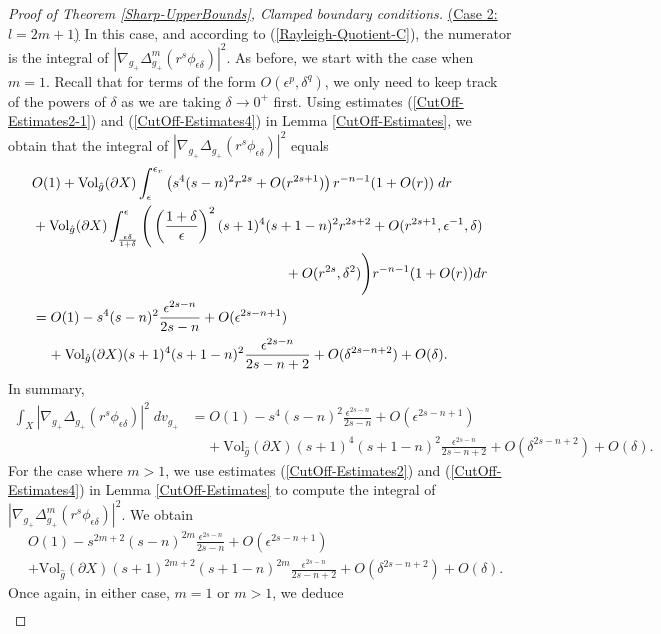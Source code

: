 \documentclass{amsart}
\newcommand{\Vol}{\text{Vol}}
\newcommand{\D}{\delta}
\newcommand{\E}{\epsilon}
\begin{document}
\begin{proof}[Proof of Theorem \ref{Sharp-UpperBounds}, Clamped boundary conditions]
\vspace{.15in}
    \underline{(Case 2: $l=2m+1$)} In this case, and according to (\ref{Rayleigh-Quotient-C}), the numerator is the integral of $|\nabla_{g_+}\Delta^m_{g_+}(r^s\phi_{\E\D})|^2$. As before, we start with the case when $m=1$. Recall that for terms of the form $O(\E^p,\D^q)$, we only need to keep track of the powers of $\D$ as we are taking $\D\to0^+$ first. Using estimates (\ref{CutOff-Estimates2-1}) and (\ref{CutOff-Estimates4}) in Lemma \ref{CutOff-Estimates}, we obtain that the integral of $|\nabla_{g_+}\Delta_{g_+}(r^s\phi_{\E\D})|^2$ equals 
    \[
    \begin{split}
        &O(1) + \Vol_{\hat g}(\partial X)\int_{\E}^{\E_r}\left(s^{4}(s-n)^{2}r^{2s} + O(r^{2s+1}) \right)r^{-n-1}(1+O(r))\;dr \\ &+ \Vol_{\hat g}(\partial X)\int_{\frac{\E\D}{1+\D}}^{\E}\Bigg(\left(\frac{1+\D}{\E}\right)^2(s+1)^4(s+1-n)^2r^{2s+2} +O(r^{2s+1},\E^{-1},\D)\\&\hspace{2.5in}+O(r^{2s},\D^2)\Bigg)r^{-n-1}(1+O(r))dr \\&= O(1) - s^4(s-n)^2\frac{\E^{2s-n}}{2s-n} + O(\E^{2s-n+1}) \\&\;\;\;\;+ \Vol_{\hat g}(\partial X)(s+1)^4(s+1-n)^2\frac{\E^{2s-n}}{2s-n+2} + O(\D^{2s-n+2}) + O(\D).
    \end{split}
    \]
    In summary,
    \[
    \begin{split}
    \int_X|\nabla_{g_+}\Delta_{g_+}(r^s\phi_{\E\D})|^2\;dv_{g_+} &= O(1) - s^4(s-n)^2\frac{\E^{2s-n}}{2s-n} + O(\E^{2s-n+1}) \\&\;\;\;\;+ \Vol_{\hat g}(\partial X)(s+1)^4(s+1-n)^2\frac{\E^{2s-n}}{2s-n+2} + O(\D^{2s-n+2}) + O(\D).
    \end{split}
    \]
    For the case where $m>1$, we use estimates (\ref{CutOff-Estimates2}) and (\ref{CutOff-Estimates4}) in Lemma \ref{CutOff-Estimates} to compute the integral of $|\nabla_{g_+}\Delta^m_{g_+}(r^s\phi_{\E\D})|^2$. We obtain
    \[
    \begin{split}
        &O(1) - s^{2m+2}(s-n)^{2m}\frac{\E^{2s-n}}{2s-n}+ O(\E^{2s-n+1}) \\&+ \Vol_{\hat g}(\partial X) (s+1)^{2m+2}(s+1-n)^{2m}\frac{\E^{2s-n}}{2s-n+2} + O(\D^{2s-n+2}) + O(\D).
    \end{split}
    \]
    Once again, in either case, $m=1$ or $m>1$, we deduce
    \begin{equation}\label{Sharp-UB-Clamped3}
    \begin{split}

\end{split}
\end{equation}
\end{proof}
\end{document}
